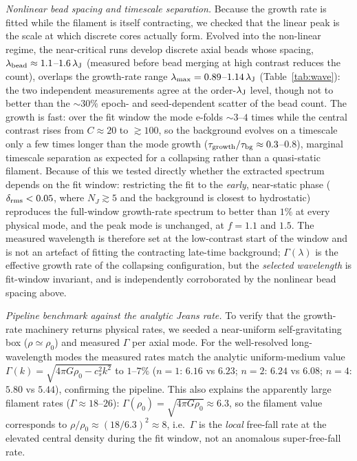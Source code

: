 \documentclass[usenatbib,twoside,twocolumn]{mnras}
\begin{document}
\emph{Nonlinear bead spacing and timescale separation.} Because the growth rate is fitted while the filament is itself contracting, we checked that the linear peak is the scale at which discrete cores actually form. Evolved into the non-linear regime, the near-critical runs develop discrete axial beads whose spacing, $\lambda_{\rm bead}\approx1.1$--$1.6\,\lambda_{\rm J}$ (measured before bead merging at high contrast reduces the count), overlaps the growth-rate range $\lambda_{\rm max}=0.89$--$1.14\,\lambda_{\rm J}$ (Table~\ref{tab:wave}): the two independent measurements agree at the order-$\lambda_{\rm J}$ level, though not to better than the $\sim30\%$ epoch- and seed-dependent scatter of the bead count. The growth is fast: over the fit window the mode e-folds $\sim3$--$4$ times while the central contrast rises from $C\approx20$ to $\gtrsim100$, so the background evolves on a timescale only a few times longer than the mode growth ($\tau_{\rm growth}/\tau_{\rm bg}\approx0.3$--$0.8$), marginal timescale separation as expected for a collapsing rather than a quasi-static filament. Because of this we tested directly whether the extracted spectrum depends on the fit window: restricting the fit to the \emph{early}, near-static phase ($\delta_{\rm rms}<0.05$, where $N_J\gtrsim5$ and the background is closest to hydrostatic) reproduces the full-window growth-rate spectrum to better than $1\%$ at every physical mode, and the peak mode is unchanged, at $f=1.1$ and $1.5$. The measured wavelength is therefore set at the low-contrast start of the window and is not an artefact of fitting the contracting late-time background; $\Gamma(\lambda)$ is the effective growth rate of the collapsing configuration, but the \emph{selected wavelength} is fit-window invariant, and is independently corroborated by the nonlinear bead spacing above.

\emph{Pipeline benchmark against the analytic Jeans rate.} To verify that the growth-rate machinery returns physical rates, we seeded a near-uniform self-gravitating box ($\rho\simeq\rho_0$) and measured $\Gamma$ per axial mode. For the well-resolved long-wavelength modes the measured rates match the analytic uniform-medium value $\Gamma(k)=\sqrt{4\pi G\rho_0-c_s^2k^2}$ to $1$--$7\%$ ($n{=}1$: $6.16$ vs $6.23$; $n{=}2$: $6.24$ vs $6.08$; $n{=}4$: $5.80$ vs $5.44$), confirming the pipeline. This also explains the apparently large filament rates ($\Gamma\approx18$--$26$): $\Gamma(\rho_0)=\sqrt{4\pi G\rho_0}\approx6.3$, so the filament value corresponds to $\rho/\rho_0\approx(18/6.3)^2\approx8$, i.e.\ $\Gamma$ is the \emph{local} free-fall rate at the elevated central density during the fit window, not an anomalous super-free-fall rate.
\end{document}
